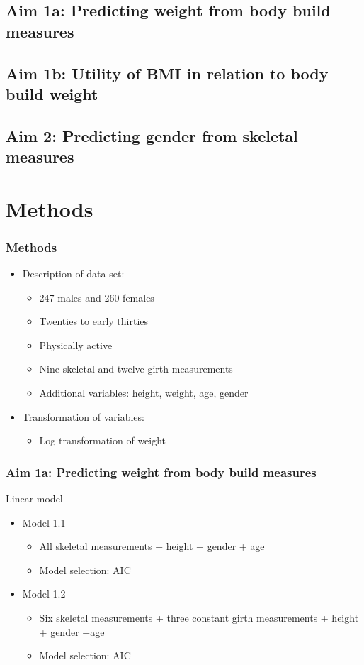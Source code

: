 \documentclass{beamer}
\begin{document}
\subsection{Aim 1a: Predicting weight from body build measures}

\subsection{Aim 1b: Utility of BMI in relation to body build weight}

\subsection{Aim 2: Predicting gender from skeletal measures}

\section{Methods}

\begin{frame}
\frametitle{Methods}

\begin{itemize}
	\item Description of data set:  
		\begin{itemize}
			\item 247 males and 260 females
			\item Twenties to early thirties
			\item Physically active
			\item Nine skeletal and twelve girth measurements
			\item Additional variables: height, weight, age, gender
		\end{itemize}
	\item Transformation of variables:
		\begin{itemize}
			\item Log transformation of weight
		\end{itemize}
\end{itemize}

\end{frame}

\begin{frame}
\frametitle{Aim 1a: Predicting weight from body build measures}

Linear model 
\begin{itemize}
	\item Model 1.1
		\begin{itemize}
			\item All skeletal measurements + height + gender + age
			\item Model selection: AIC
		\end{itemize}
	\item Model 1.2
		\begin{itemize}
			\item Six skeletal measurements + three constant girth measurements + height + gender +age
			\item Model selection: AIC 
		\end{itemize}
\end{itemize}

\end{frame}
\end{document}
